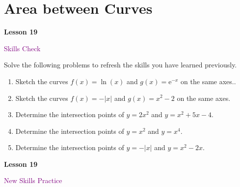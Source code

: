 \documentclass[10pt]{book}
\theoremstyle{definition}
\theoremstyle{remark}
\begin{document}
\section{Area between Curves}
\begin{tcolorbox}[
  width=\textwidth,
  colback=gray!10, %
  colframe=white, %
  boxrule=0pt,    %
  left=1cm,       %
  right=1cm,      %
  sharp corners  %
]

\begin{minipage}[t]{0.5\textwidth}
  \Huge \textbf{Lesson 19}
\end{minipage}%
\hfill
\begin{minipage}[t]{0.5\textwidth}
  \Huge \textcolor{purple}{Skills Check}
\end{minipage}
\end{tcolorbox}

\begin{large}
\noindent
Solve the following problems to refresh the skills you have learned previously.
\begin{enumerate}
\item Sketch the curves $f(x) = \ln(x)$ and $g(x) = \textrm{e}^{-x}$ on the same axes..\vfil \vfil \vfil
\item Sketch the curves $f(x) = -|x|$ and $g(x) = x^{2}-2$ on the same axes. \vfil \vfil\vfil
\item Determine the intersection points of $y=2x^{2}$ and $y=x^{2}+5x-4$.\vfil \vfil \vfil
\item Determine the intersection points of $y=x^{2}$ and $y=x^{4}$.\vfil \vfil \vfil
\item Determine the intersection points of $y=-|x|$ and $y=x^{2}-2x$.\vfil \vfil \vfil
\end{enumerate}
\end{large}
\newpage


\begin{tcolorbox}[
  width=\textwidth,
  colback=gray!10, %
  colframe=white, %
  boxrule=0pt,    %
  left=1cm,       %
  right=1cm,      %
  sharp corners  %
]

\begin{minipage}[t]{0.5\textwidth}
  \Huge \textbf{Lesson 19}
\end{minipage}%
\hfill
\begin{minipage}[t]{0.5\textwidth}
  \Huge\textcolor{purple}{New Skills Practice}
\end{minipage}
\end{tcolorbox}
\end{document}
